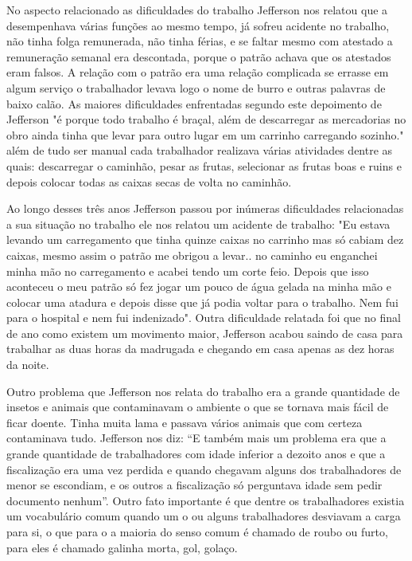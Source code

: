  No aspecto relacionado as dificuldades do trabalho Jefferson nos relatou que a desempenhava várias
 funções ao mesmo tempo, já sofreu acidente no trabalho, não tinha folga remunerada, não tinha
 férias, e se faltar mesmo com atestado a remuneração semanal era descontada, porque o patrão 
 achava que os atestados eram falsos. A relação com o patrão era uma relação complicada se errasse
 em algum serviço o trabalhador levava logo o nome de burro e outras palavras de baixo calão. 
 As maiores dificuldades enfrentadas segundo este depoimento de Jefferson "é porque todo trabalho 
 é braçal, além de descarregar as mercadorias no obro ainda tinha que levar para outro lugar em
 um carrinho carregando sozinho." além de tudo ser manual cada trabalhador realizava várias atividades
 dentre as quais: descarregar o caminhão, pesar as frutas, selecionar as frutas boas e ruins e depois 
 colocar todas as caixas secas de volta no caminhão.

 Ao longo desses três anos Jefferson passou por inúmeras dificuldades relacionadas a sua situação no
 trabalho ele nos relatou um acidente de trabalho: "Eu estava levando um carregamento que tinha quinze 
 caixas no carrinho mas só cabiam dez caixas, mesmo assim o patrão me obrigou a levar.. no caminho eu 
 enganchei minha mão no carregamento e acabei tendo um corte feio. Depois que isso aconteceu o meu 
 patrão só fez jogar um pouco de água gelada na minha mão e colocar uma atadura e depois disse que já
 podia voltar para o trabalho. Nem fui para o hospital e nem fui indenizado". Outra dificuldade relatada
 foi que no final de ano como existem um movimento maior, Jefferson acabou saindo de casa para trabalhar
 as duas horas da madrugada e chegando em casa apenas as dez horas da noite.

 Outro problema que Jefferson nos relata do trabalho era a grande quantidade de insetos e animais que 
 contaminavam o ambiente o que se tornava mais fácil de ficar doente. Tinha muita lama e passava vários
 animais que com certeza contaminava tudo. Jefferson nos diz: “E também mais um problema era que a 
 grande quantidade de trabalhadores com idade inferior a dezoito anos e que a fiscalização era uma vez
 perdida e quando chegavam alguns dos trabalhadores de menor se escondiam, e os outros a fiscalização
 só perguntava idade sem pedir documento nenhum”. Outro fato importante é que dentre os trabalhadores 
 existia um vocabulário comum quando um o ou alguns trabalhadores desviavam a carga para si, o que para 
 o a maioria do senso comum é chamado de roubo ou furto, para eles é chamado galinha morta, gol, golaço.
 
